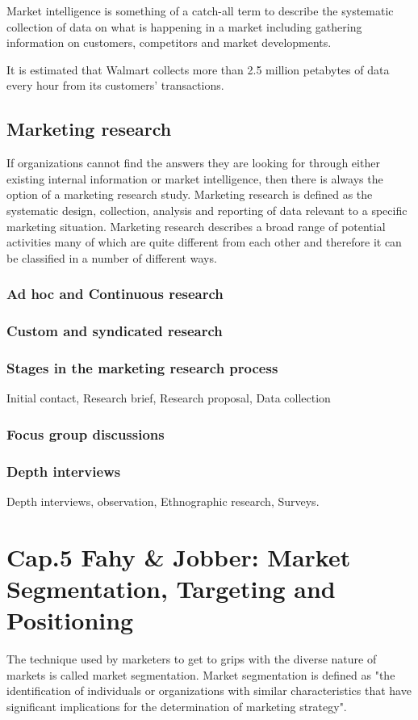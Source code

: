 \documentclass{article}
\begin{document}
Market intelligence is something of a catch-all term to describe the systematic collection of data on what is happening in a market including gathering information on customers, competitors and market developments.

It is estimated that Walmart collects more than 2.5 million petabytes of data every hour from its customers' transactions.

\subsection{Marketing research}
If organizations cannot find the answers they are looking for through either existing internal information or market intelligence, then there is always the option of a marketing research study. Marketing research is defined as the systematic design, collection, analysis and reporting of data relevant to a specific marketing situation. Marketing research describes a broad range of potential activities many of which are quite different from each other and therefore it can be classified in a number of different ways.

\subsubsection*{Ad hoc and Continuous research}
\subsubsection*{Custom and syndicated research}
\subsubsection*{Stages in the marketing research process}
Initial contact, Research brief, Research proposal, Data collection
\subsubsection*{Focus group discussions}
\subsubsection*{Depth interviews}
Depth interviews, observation, Ethnographic research, Surveys.


\section{Cap.5 Fahy \& Jobber: Market Segmentation, Targeting and Positioning}
The technique used by marketers to get to grips with the diverse nature of markets is called market segmentation. Market segmentation is defined as "the identification of individuals or organizations with similar characteristics that have significant implications for the determination of marketing strategy".
\end{document}
